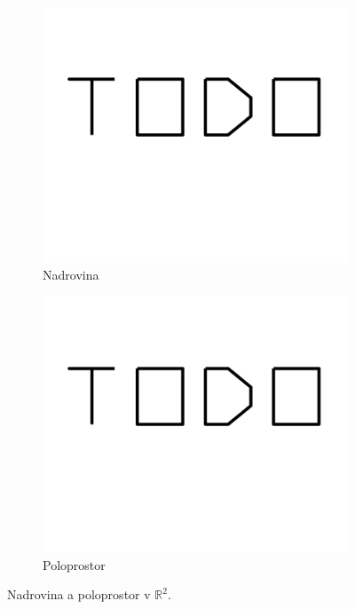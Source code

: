 \begin{figure}[h!]
    \centering
    \begin{subfigure}[b]{0.3\textwidth}
        \centering
        \includegraphics[width=\textwidth]{img/todo.png}   
        \caption{Nadrovina}
        \label{fig:hyperplane}
    \end{subfigure}

    \hfill

    \begin{subfigure}[b]{0.3\textwidth}
        \centering
        \includegraphics[width=\textwidth]{img/todo.png}   
        \caption{Poloprostor}
        \label{fig:halfspace}
    \end{subfigure}

    \caption{Nadrovina a poloprostor v $\mathbb{R}^2$.}
    \label{fig:hyperplane_halfspace}
\end{figure}

